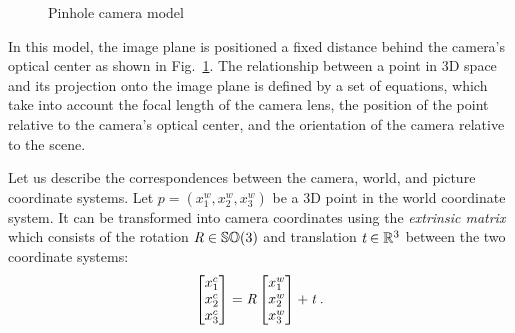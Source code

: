 \documentclass[graybox]{svmult}
\begin{document}
\begin{figure}
\caption{Pinhole camera model}
\label{fig:camera}
\end{figure}

In this model, the image plane is positioned a fixed distance behind the camera's optical center as shown in Fig.~\ref{fig:camera}. The relationship between a point in 3D space and its projection onto the image plane is defined by a set of equations, which take into account the focal length of the camera lens, the position of the point relative to the camera's optical center, and the orientation of the camera relative to the scene.


Let us describe the correspondences between the camera, world, and picture coordinate systems.
Let $p = (x_1^w, x_2^w, x_3^w)$ be a 3D point in the world coordinate system.
It can be transformed into camera coordinates using the \emph{extrinsic matrix} which consists of the rotation $\emph{R} \in \mathbb{SO}(3)$  and translation $\emph{t} \in \mathbb{R}^3$ between the two coordinate systems:
    $$
     \begin{bmatrix}
	 x_1^c\\x_2^c\\x_3^c		
	 \end{bmatrix}
	 =
	 \emph{R}
	 \begin{bmatrix}
	 x_1^w\\x_2^w\\x_3^w		
	 \end{bmatrix}
	 + \emph{t}
	 \label{eq:wc} \; .
$$
\end{document}
